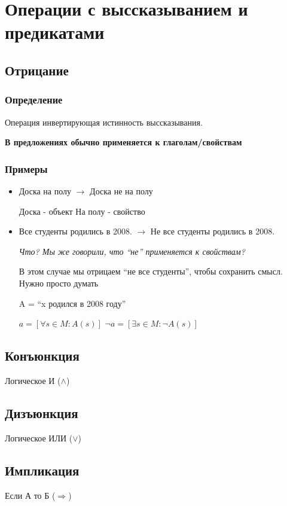 \documentclass[letterpaper]{article}
\begin{document}
\section{Операции с выссказыванием и предикатами}
\label{sec:orgd2d415c}
\subsection{Отрицание}
\label{sec:orgfd7c3f4}
\subsubsection{Определение}
\label{sec:orgcdfe7b8}
Операция инвертирующая истинность выссказывания.

\textbf{В предложениях обычно применяется к глаголам/свойствам}
\subsubsection{Примеры}
\label{sec:orgf209da0}
\begin{itemize}
\item Доска на полу \(\rightarrow\) Доска не на полу

Доска - объект
На полу - свойство

\item Все студенты родились в 2008. \(\rightarrow\) Не все студенты родились в 2008.

\emph{Что? Мы же говорили, что ``не'' применяется к свойствам?}

В этом случае мы отрицаем ``не все студенты'', чтобы сохранить смысл. Нужно просто думать

A = ``x родился в 2008 году''

\(a = [\forall s \in M: A(s)]\)
\(\neg{a} = [\exists s \in M: \neg{A(s)}]\)
\end{itemize}
\subsection{Конъюнкция}
\label{sec:orgedda6c2}
Логическое И (\(\land\))
\subsection{Дизъюнкция}
\label{sec:org279f8ca}
Логическое ИЛИ (\(\lor\))
\subsection{Импликация}
\label{sec:org0697e21}
Если А то Б (\(\Rightarrow\))
\end{document}
